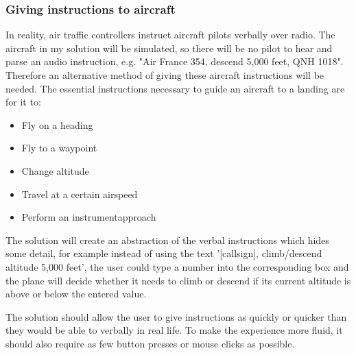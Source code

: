 \documentclass{article}
\begin{document}
\subsubsection{Giving instructions to aircraft}
In reality, air traffic controllers instruct aircraft pilots verbally over radio.
The aircraft in my solution will be simulated, so there will be no pilot to hear and parse an audio instruction, e.g. "Air France 354, descend 5,000 feet, QNH 1018".
Therefore an alternative method of giving these aircraft instructions will be needed.
The essential instructions necessary to guide an aircraft to a landing are for it to:
\begin{itemize}
    \item Fly on a \gls{heading}
    \item Fly to a \gls{waypoint}
    \item Change altitude
    \item Travel at a certain \gls{airspeed}
    \item Perform an \gls{instrumentapproach}
\end{itemize}
The solution will create an abstraction of the verbal instructions which hides some detail, for example instead of using the text '[callsign], climb/descend altitude 5,000 feet', the user could type a number into the corresponding box and the plane will decide whether it needs to climb or descend if its current altitude is above or below the entered value.

The solution should allow the user to give instructions as quickly or quicker than they would be able to verbally in real life.
To make the experience more fluid, it should also require as few button presses or mouse clicks as possible.
\end{document}
